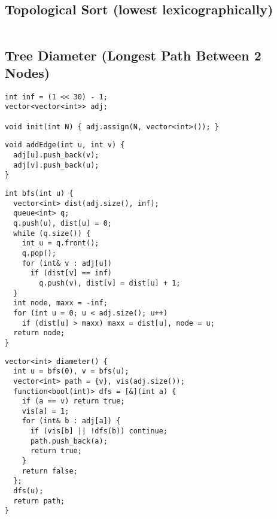 \documentclass[twoside]{article}
\begin{document}
\begin{multicols*}{2}
\subsectionfont{\large\bfseries\sffamily\underline}
\subsection*{Topological Sort (lowest lexicographically)}
\begin{verbatim}

\end{verbatim}

\subsectionfont{\large\bfseries\sffamily\underline}
\subsection*{Tree Diameter (Longest Path Between 2 Nodes)}
\begin{verbatim}
int inf = (1 << 30) - 1;
vector<vector<int>> adj;

void init(int N) { adj.assign(N, vector<int>()); }
\end{verbatim}
\vspace{-12pt}
\begin{verbatim}
void addEdge(int u, int v) {
  adj[u].push_back(v);
  adj[v].push_back(u);
}
\end{verbatim}
\vspace{-12pt}
\begin{verbatim}
int bfs(int u) {
  vector<int> dist(adj.size(), inf);
  queue<int> q;
  q.push(u), dist[u] = 0;
  while (q.size()) {
    int u = q.front();
    q.pop();
    for (int& v : adj[u])
      if (dist[v] == inf)
        q.push(v), dist[v] = dist[u] + 1;
  }
  int node, maxx = -inf;
  for (int u = 0; u < adj.size(); u++)
    if (dist[u] > maxx) maxx = dist[u], node = u;
  return node;
}
\end{verbatim}
\vspace{-12pt}
\begin{verbatim}
vector<int> diameter() {
  int u = bfs(0), v = bfs(u);
  vector<int> path = {v}, vis(adj.size());
  function<bool(int)> dfs = [&](int a) {
    if (a == v) return true;
    vis[a] = 1;
    for (int& b : adj[a]) {
      if (vis[b] || !dfs(b)) continue;
      path.push_back(a);
      return true;
    }
    return false;
  };
  dfs(u);
  return path;
}
\end{verbatim}


\end{multicols*}
\end{document}
